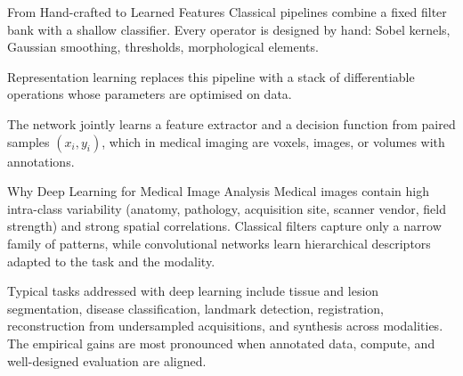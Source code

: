 \begin{frame}{From Hand-crafted to Learned Features}
    Classical pipelines combine a fixed filter bank with a shallow classifier. Every operator is designed by hand: Sobel kernels, Gaussian smoothing, thresholds, morphological elements.

    Representation learning replaces this pipeline with a stack of differentiable operations whose parameters are optimised on data.
    \begin{center}
    \end{center}
    The network jointly learns a feature extractor and a decision function from paired samples $(x_i, y_i)$, which in medical imaging are voxels, images, or volumes with annotations.
\end{frame}

\begin{frame}{Why Deep Learning for Medical Image Analysis}
    Medical images contain high intra-class variability (anatomy, pathology, acquisition site, scanner vendor, field strength) and strong spatial correlations. Classical filters capture only a narrow family of patterns, while convolutional networks learn hierarchical descriptors adapted to the task and the modality.

    Typical tasks addressed with deep learning include tissue and lesion segmentation, disease classification, landmark detection, registration, reconstruction from undersampled acquisitions, and synthesis across modalities. The empirical gains are most pronounced when annotated data, compute, and well-designed evaluation are aligned.
\end{frame}


